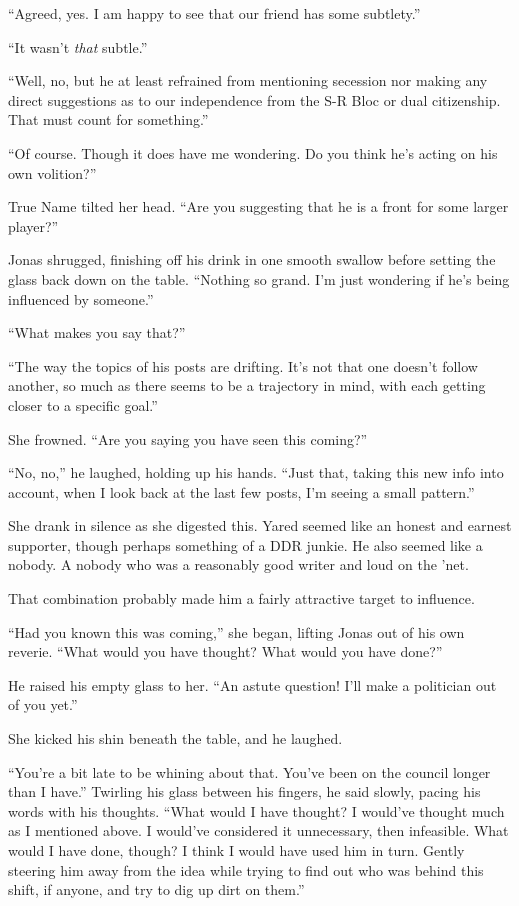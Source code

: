 ``Agreed, yes. I am happy to see that our friend has some subtlety.''

``It wasn't \emph{that} subtle.''

``Well, no, but he at least refrained from mentioning secession nor making any direct suggestions as to our independence from the S-R Bloc or dual citizenship. That must count for something.''

``Of course. Though it does have me wondering. Do you think he's acting on his own volition?''

True Name tilted her head. ``Are you suggesting that he is a front for some larger player?''

Jonas shrugged, finishing off his drink in one smooth swallow before setting the glass back down on the table. ``Nothing so grand. I'm just wondering if he's being influenced by someone.''

``What makes you say that?''

``The way the topics of his posts are drifting. It's not that one doesn't follow another, so much as there seems to be a trajectory in mind, with each getting closer to a specific goal.''

She frowned. ``Are you saying you have seen this coming?''

``No, no,'' he laughed, holding up his hands. ``Just that, taking this new info into account, when I look back at the last few posts, I'm seeing a small pattern.''

She drank in silence as she digested this. Yared seemed like an honest and earnest supporter, though perhaps something of a DDR junkie. He also seemed like a nobody. A nobody who was a reasonably good writer and loud on the 'net.

That combination probably made him a fairly attractive target to influence.

``Had you known this was coming,'' she began, lifting Jonas out of his own reverie. ``What would you have thought? What would you have done?''

He raised his empty glass to her. ``An astute question! I'll make a politician out of you yet.''

She kicked his shin beneath the table, and he laughed.

``You're a bit late to be whining about that. You've been on the council longer than I have.'' Twirling his glass between his fingers, he said slowly, pacing his words with his thoughts. ``What would I have thought? I would've thought much as I mentioned above. I would've considered it unnecessary, then infeasible. What would I have done, though? I think I would have used him in turn. Gently steering him away from the idea while trying to find out who was behind this shift, if anyone, and try to dig up dirt on them.''

